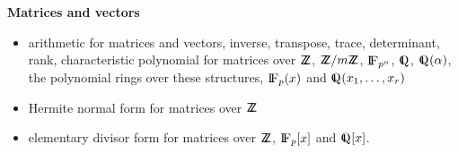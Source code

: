 \vspace{0.4cm}

\begin{center}
{\large {\bf Matrices and vectors }}
\end{center}

\begin{itemize}
\item arithmetic for matrices and vectors, inverse, transpose, trace, 
      determinant, rank, characteristic polynomial for matrices over
	${{\sf Z}\hspace{-1.3mm}{\sf Z}}$, ${{\sf Z}\hspace{-1.3mm}{\sf Z}}/m{{\sf Z}\hspace{-1.3mm}{\sf Z}}$, ${\rm{I\!F}}_{p^n}$, $\Q$, $\Q(\alpha)$,
	the polynomial rings over these structures,
	${\rm{I\!F}}_p(x)$ and $\Q(x_1, \ldots, x_r)$
\item Hermite normal form for matrices over ${{\sf Z}\hspace{-1.3mm}{\sf Z}}$
\item elementary divisor form for matrices over ${{\sf Z}\hspace{-1.3mm}{\sf Z}}$, ${\rm{I\!F}}_p[x]$ and
$\Q[x]$.
\end{itemize}

